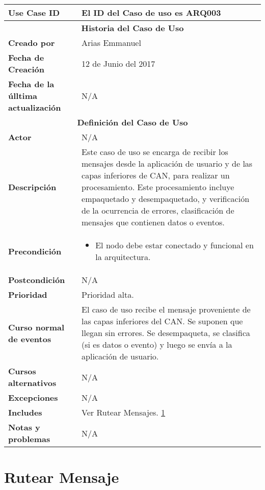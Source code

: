 \begin{longtable}{|p{5cm}|p{8cm}|}
  \hline
  \textbf{Use Case ID} & El ID del Caso de uso es ARQ003 \\ \hline
  \multicolumn{2}{|c|}{\Large\textbf{Historia del Caso de Uso}} \\ \hline
  \textbf{Creado por} & Arias Emmanuel \\ \hline
  \textbf{Fecha de Creación} & 12 de Junio del 2017 \\ \hline
  \textbf{Fecha de la úlltima actualización} & N/A \\ \hline
  \multicolumn{2}{|c|}{\Large\textbf{Definición del Caso de Uso}} \\ \hline
  \textbf{Actor} & N/A \\ \hline
  \textbf{Descripción} & Este caso de uso se encarga de recibir los mensajes desde la aplicación
de usuario y de las capas inferiores de CAN, para realizar un procesamiento.
Este procesamiento incluye empaquetado y desempaquetado, y verificación de
la ocurrencia de errores, clasificación de mensajes que contienen datos
o eventos. \\ \hline
  \textbf{Precondición} &\begin{itemize}
\item El nodo debe estar conectado y funcional en la arquitectura.
\end{itemize} \\ \hline
  \textbf{Postcondición}  & N/A \\ \hline
  \textbf{Prioridad} & Prioridad alta. \\ \hline
  \textbf{Curso normal de eventos} & El caso de uso recibe el mensaje proveniente de las capas inferiores del CAN.
Se suponen que llegan sin errores. Se desempaqueta, se clasifica (si es datos
o evento) y luego se envía a la aplicación de usuario. \\ \hline
\textbf{Cursos alternativos} & N/A \\ \hline
\textbf{Excepciones} & N/A \\ \hline
\textbf{Includes} & Ver Rutear Mensajes. \ref{uc:RutearMensajes} \\ \hline
\textbf{Notas y problemas} & N/A \\ \hline
\end{longtable}



\section{Rutear Mensaje}\label{uc:RutearMensajes}

